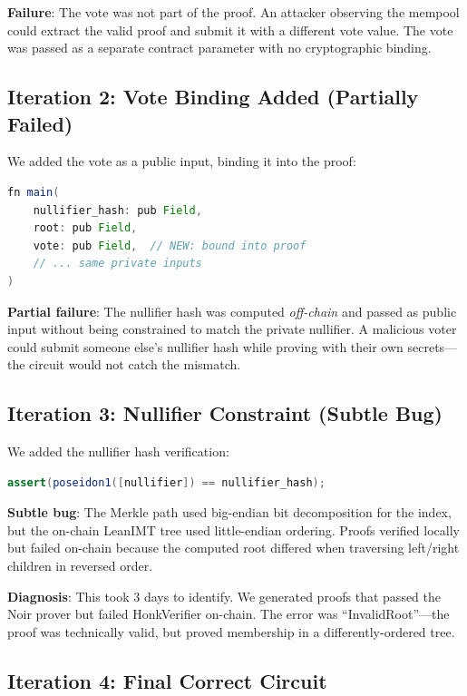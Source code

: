 \textbf{Failure}: The vote was not part of the proof. An attacker observing the mempool could extract the valid proof and submit it with a different vote value. The vote was passed as a separate contract parameter with no cryptographic binding.

\subsection{Iteration 2: Vote Binding Added (Partially Failed)}

We added the vote as a public input, binding it into the proof:
\begin{lstlisting}[language=Java, caption={Circuit v2: added vote binding.}]
fn main(
    nullifier_hash: pub Field,
    root: pub Field,
    vote: pub Field,  // NEW: bound into proof
    // ... same private inputs
)
\end{lstlisting}

\textbf{Partial failure}: The nullifier hash was computed \textit{off-chain} and passed as public input without being constrained to match the private nullifier. A malicious voter could submit someone else's nullifier hash while proving with their own secrets---the circuit would not catch the mismatch.

\subsection{Iteration 3: Nullifier Constraint (Subtle Bug)}

We added the nullifier hash verification:
\begin{lstlisting}[language=Java, caption={Circuit v3: nullifier constraint added.}]
assert(poseidon1([nullifier]) == nullifier_hash);
\end{lstlisting}

\textbf{Subtle bug}: The Merkle path used big-endian bit decomposition for the index, but the on-chain LeanIMT tree used little-endian ordering. Proofs verified locally but failed on-chain because the computed root differed when traversing left/right children in reversed order.

\textbf{Diagnosis}: This took 3 days to identify. We generated proofs that passed the Noir prover but failed HonkVerifier on-chain. The error was ``InvalidRoot''---the proof was technically valid, but proved membership in a differently-ordered tree.

\subsection{Iteration 4: Final Correct Circuit}


